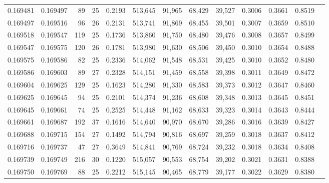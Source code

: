 \begin{tabular}{rrrrrrrrrrrrr}
0.169481 & 0.169497 &  89 &  25 &                                     0.2193 & 513,645 &  91,965 &  68,429 &  39,527 & 0.3006 & 0.3661 & 0.8519 \\
0.169497 & 0.169516 &  96 &  26 &                                     0.2131 & 513,741 &  91,869 &  68,455 &  39,501 & 0.3007 & 0.3659 & 0.8510 \\
0.169518 & 0.169547 & 119 &  25 &                                     0.1736 & 513,860 &  91,750 &  68,480 &  39,476 & 0.3008 & 0.3657 & 0.8499 \\
0.169547 & 0.169575 & 120 &  26 &                                     0.1781 & 513,980 &  91,630 &  68,506 &  39,450 & 0.3010 & 0.3654 & 0.8488 \\
0.169575 & 0.169586 &  82 &  25 &                                     0.2336 & 514,062 &  91,548 &  68,531 &  39,425 & 0.3010 & 0.3652 & 0.8480 \\
0.169586 & 0.169603 &  89 &  27 &                                     0.2328 & 514,151 &  91,459 &  68,558 &  39,398 & 0.3011 & 0.3649 & 0.8472 \\
0.169604 & 0.169625 & 129 &  25 &                                     0.1623 & 514,280 &  91,330 &  68,583 &  39,373 & 0.3012 & 0.3647 & 0.8460 \\
0.169625 & 0.169645 &  94 &  25 &                                     0.2101 & 514,374 &  91,236 &  68,608 &  39,348 & 0.3013 & 0.3645 & 0.8451 \\
0.169645 & 0.169661 &  74 &  25 &                                     0.2525 & 514,448 &  91,162 &  68,633 &  39,323 & 0.3014 & 0.3643 & 0.8444 \\
0.169661 & 0.169687 & 192 &  37 &                                     0.1616 & 514,640 &  90,970 &  68,670 &  39,286 & 0.3016 & 0.3639 & 0.8427 \\
0.169688 & 0.169715 & 154 &  27 &                                     0.1492 & 514,794 &  90,816 &  68,697 &  39,259 & 0.3018 & 0.3637 & 0.8412 \\
0.169716 & 0.169737 &  47 &  27 &                                     0.3649 & 514,841 &  90,769 &  68,724 &  39,232 & 0.3018 & 0.3634 & 0.8408 \\
0.169739 & 0.169749 & 216 &  30 &                                     0.1220 & 515,057 &  90,553 &  68,754 &  39,202 & 0.3021 & 0.3631 & 0.8388 \\
0.169750 & 0.169769 &  88 &  25 &                                     0.2212 & 515,145 &  90,465 &  68,779 &  39,177 & 0.3022 & 0.3629 & 0.8380 \\

\end{tabular}
